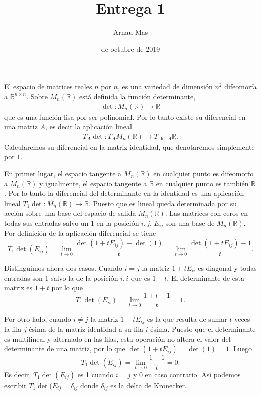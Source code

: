 \documentclass[12pt]{article}
\title{\sffamily {\bfseries Topología de variedades:} Entrega 1}
\author{\sffamily Arnau Mas}
\date{\sffamily 4 de octubre de 2019}
\numberwithin{table}{section}
\numberwithin{figure}{section}
\newcommand{\R}{\mathbb{R}}
\begin{document}
\maketitle

El espacio de matrices reales \( n \) por \( n \), es una variedad de dimensión \( n^2 \) difeomorfa a \( \R^{n\times n} \). Sobre \( M_n(\R) \) está definida la función determinante,
\begin{align*}
	\det \colon M_n(\R) \to \R
\end{align*}
que es una función lisa por ser polinomial. Por lo tanto existe su diferencial en una matriz \( A \), es decir la aplicación lineal
\begin{align*}
	T_A \det \colon T_A M_n(\R) \to T_{\det A} \R. 
\end{align*}
Calcularemos su diferencial en la matriz identidad, que denotaremos simplemente por \( 1 \). 

En primer lugar, el espacio tangente a \( M_n(\R) \) en cualquier punto es difeomorfo a \( M_n(\R) \) y igualmente, el espacio tangente a \( \R \) en cualquier punto es también \( \R \). Por lo tanto la diferencial del determinante en la identidad es una aplicación lineal \( T_1 \det \colon M_n(\R) \to \R \). Puesto que es lineal queda determinada por su acción sobre una base del espacio de salida \( M_n(\R) \). Las matrices con ceros en todas sus entradas salvo un 1 en la posición \( i,j \), \( E_{ij} \) son una base de \( M_n(\R) \). Por definición de la aplicación diferencial se tiene
\begin{equation*}
	T_1 \det(E_{ij}) = \lim_{t \to 0} \frac{\det(1 + tE_{ij}) - \det(1)}{t} = \lim_{t \to 0} \frac{\det(1 + tE_{ij}) - 1}{t}.
\end{equation*}

Distinguimos ahora dos casos. Cuando \( i = j \) la matriz \( 1 + tE_{ii} \) es diagonal y todas entradas son 1 salvo la de la posición \( i,i \) que es \( 1 + t \). El determinante de esta matriz es \( 1 + t \) por lo que
\begin{equation*}
	T_1 \det(E_{ii}) = \lim_{t \to 0} \frac{1 + t - 1}{t} = 1.
\end{equation*}

Por otro lado, cuando \( i \neq j \) la matriz \( 1 + tE_{ij} \) es la que resulta de sumar \( t \) veces la fila \( j \)-ésima de la matriz identidad a su fila \( i \)-ésima. Puesto que el determinante es multilineal y alternado en las filas, esta operación no altera el valor del determinante de una matriz, por lo que \( \det(1 + tE_{ij}) = \det(1) = 1 \). Luego
\begin{equation*}
	T_1 \det(E_{ij}) = \lim_{t \to 0} \frac{1 - 1}{t} = 0.
\end{equation*}
Es decir, \( T_1 \det(E_{ij}) \) es 1 cuando \( i = j \) y 0 en caso contrario. Así podemos escribir \( T_1 \det(E_{ij} = \delta_{ij} \) donde \( \delta_{ij} \) es la delta de Kronecker. 
\end{document}
